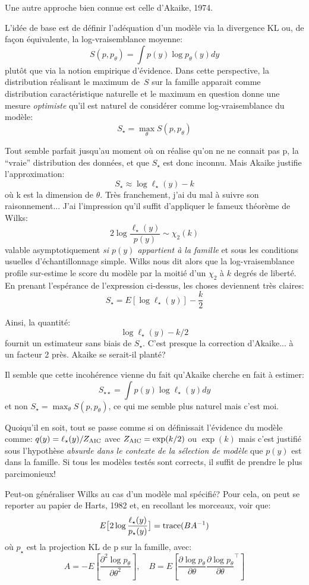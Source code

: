 \documentclass{article}
\begin{document}
Une autre approche bien connue est celle d'Akaike, 1974.

L'id\'ee de base est de d\'efinir l'ad\'equation d'un mod\`ele via la divergence KL ou, de fa\c{c}on \'equivalente, la log-vraisemblance moyenne: 
$$S(p, p_\theta) = \int p(y) \log p_\theta(y) dy$$ 
plut\^ot que via la notion empirique d'\'evidence. Dans cette perspective, la distribution r\'ealisant le maximum de~$S$ sur la famille apparait comme distribution caract\'eristique naturelle et le maximum en question donne une mesure {\em optimiste} qu'il est naturel de consid\'erer comme log-vraisemblance du mod\`ele: 
$$S_\star = \max_\theta S(p, p_\theta)$$ 

Tout semble parfait jusqu'au moment o\`u on r\'ealise qu'on ne ne connait pas p, la ``vraie'' distribution des donn\'ees, et que $S_\star$ est donc inconnu. Mais Akaike justifie l'approximation: 
$$S_\star \approx \log \ell_\star(y) - k$$ 
o\`u k est la dimension de $\theta$. Tr\`es franchement, j'ai du mal \`a suivre son raisonnement... 
J'ai l'impression qu'il suffit d'appliquer le fameux th\'eor\`eme de Wilks: 
$$2 \log \frac{\ell_\star(y)}{p(y)} \sim \chi_2(k)$$ 
valable asymptotiquement {\em si $p(y)$ appartient \`a la famille} et sous les conditions usuelles d'\'echantillonnage simple. Wilks nous dit alors que la log-vraisemblance profile sur-estime le score du mod\`ele par la moiti\'e d'un $\chi_2$ \`a $k$ degr\'es de libert\'e. En prenant l'esp\'erance de l'expression ci-dessus, les choses deviennent tr\`es claires: 
$$S_\star = E[\log \ell_\star(y)] - \frac{k}{2}$$ 

Ainsi, la quantit\'e: 
$$\log \ell_\star(y) - k/2$$ 
fournit un estimateur sans biais de $S_\star$. C'est presque la correction d'Akaike... \`a un facteur 2 pr\`es. Akaike se serait-il plant\'e? 

Il semble que cette incoh\'erence vienne du fait qu'Akaike cherche en fait \`a estimer: 
$$S_{\star\star} = \int p(y) \log \ell_\star(y) dy$$ 
et non $S_\star = \max_\theta S(p, p_\theta)$, ce qui me semble plus naturel mais c'est moi. 

Quoiqu'il en soit, tout se passe comme si on d\'efinissait l'\'evidence du mod\`ele comme: $q(y) = \ell_\star(y)/Z_{\rm AIC}$ avec $Z_{\rm AIC} = \exp(k/2)$ ou $\exp(k)$ mais c'est justifi\'e sous l'hypoth\`ese {\em absurde dans le contexte de la s\'election de mod\`ele} que $p(y)$ est dans la famille. Si tous les mod\`eles test\'es sont corrects, il suffit de prendre le plus parcimonieux! 

Peut-on g\'en\'eraliser Wilks au cas d'un mod\`ele mal sp\'ecifi\'e? Pour cela, on peut se reporter au papier de Harts, 1982 et, en recollant les morceaux, voir que: 
$$
E \big[2 \log \frac{\ell_\star(y)}{p_\star(y)} \big] = {\rm trace}(B A^{-1})
$$ 
o\`u $p_\star$ est la projection KL de p sur la famille, avec:
$$
A = -E\left[ \frac{\partial^2 \log p_\theta}{\partial\theta^2} \right],
\quad 
B = E\left[ \frac{\partial \log p_\theta}{\partial\theta} \frac{\partial \log p_\theta}{\partial\theta}^\top \right]
$$ 
\end{document}
